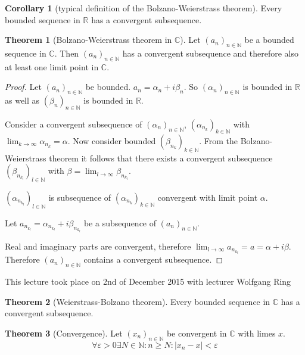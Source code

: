 \documentclass[a4paper,landscape,twocolumn]{article}
\theoremstyle{definition}
\newtheorem{theorem}{Theorem}
\newtheorem{cor}{Corollary}
\newcommand\abs[1]{\left|#1\right|}
\newcommand\seq[1]{{\left(#1\right)}_{n \in \mathbb N}}
\newcommand\meta[3]{\begin{mdframed}[skipbelow=4pt,skipabove=4pt,innermargin=1pt,innerleftmargin=1pt,innerrightmargin=1pt]\begin{center}\small{\textdownarrow{} This #1 took place on #2 with lecturer #3}\end{center}\end{mdframed}}
\begin{document}
\begin{cor}[typical definition of the Bolzano-Weierstrass theorem]
  Every bounded sequence in $\mathbb R$ has a convergent subsequence.
\end{cor}

\begin{theorem}[Bolzano-Weierstrass theorem in $\mathbb C$]
  Let $\seq{a_n}$ be a bounded sequence in $\mathbb C$.
  Then $\seq{a_n}$ has a convergent subsequence and
  therefore also at least one limit point in $\mathbb C$.
\end{theorem}
\begin{proof}
  Let $\seq{a_n}$ be bounded. $a_n = \alpha_n + i \beta_n$.
  So $\seq{\alpha_n}$ is bounded in $\mathbb R$ as well as
  $\seq{\beta_n}$ is bounded in $\mathbb R$.

  Consider a convergent subsequence of $\seq{\alpha_n}$,
  $\left(\alpha_{n_k}\right)_{k \in \mathbb N}$ with
  $\lim_{k\to\infty} \alpha_{n_k} = \alpha$.
  Now consider bounded $\left(\beta_{n_k}\right)_{k \in \mathbb N}$.
  From the Bolzano-Weierstrass theorem it follows that there
  exists a convergent subsequence $\left(\beta_{n_{k_l}}\right)_{l \in \mathbb N}$
  with $\beta = \lim_{l\to\infty} \beta_{n_{k_l}}$.

  $\left(\alpha_{n_{k_l}}\right)_{l \in \mathbb N}$ is subsequence of
  $\left(\alpha_{n_k}\right)_{k \in \mathbb N}$
  convergent with limit point $\alpha$.

  Let $a_{n_{k_l}} = \alpha_{n_{k_l}} + i \beta_{n_{k_l}}$
  be a subsequence of $(a_n)_{n\in\mathbb N}$.

  Real and imaginary parts are convergent, therefore $\lim_{l\to\infty} a_{n_{k_l}} = a = \alpha + i \beta$.
  Therefore $\seq{a_n}$ contains a convergent subsequence.
\end{proof}

\meta{lecture}{2nd of December 2015}{Wolfgang Ring}
\begin{theorem}[Weierstrass-Bolzano theorem]
  Every bounded sequence in $\mathbb C$ has a convergent subsequence.
\end{theorem}

\begin{theorem}[Convergence]
  Let $(x_n)_{n \in \mathbb N}$ be convergent in $\mathbb C$ with limes $x$.
  \[ \forall \varepsilon > 0 \exists N \in \mathbb N: n \geq N: \abs{x_n - x} < \varepsilon \]
\end{theorem}
\end{document}
